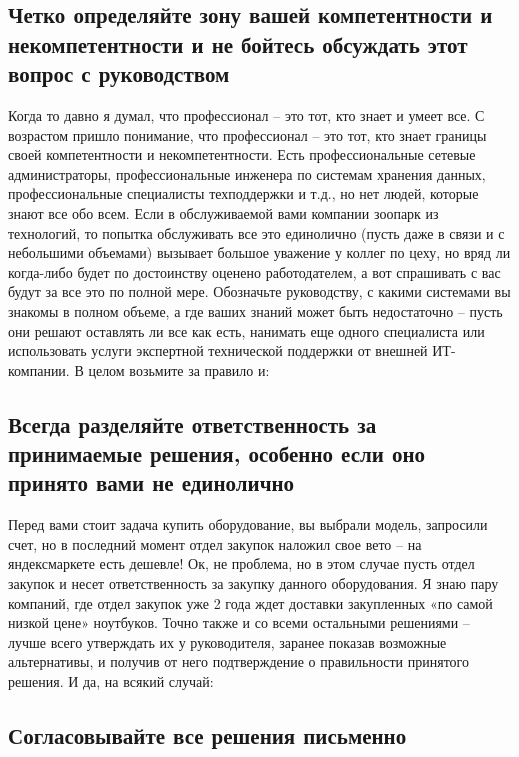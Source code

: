 	\subsection{Четко определяйте зону вашей компетентности и некомпетентности и не бойтесь обсуждать этот вопрос с руководством}
	
	Когда то давно я думал, что профессионал – это тот, кто знает и умеет все. С возрастом пришло понимание, что профессионал – это тот, кто знает границы своей компетентности и некомпетентности. Есть профессиональные сетевые администраторы, профессиональные инженера по системам хранения данных, профессиональные специалисты техподдержки и т.д., но нет людей, которые знают все обо всем. Если в обслуживаемой вами компании зоопарк из технологий, то попытка обслуживать все это единолично (пусть даже в связи и с небольшими объемами) вызывает большое уважение у коллег по цеху, но вряд ли когда-либо будет по достоинству оценено работодателем, а вот спрашивать с вас будут за все это по полной мере. Обозначьте руководству, с какими системами вы знакомы в полном объеме, а где ваших знаний может быть недостаточно – пусть они решают оставлять ли все как есть, нанимать еще одного специалиста или использовать услуги экспертной технической поддержки от внешней ИТ-компании. В целом возьмите за правило и:
	
	\subsection{Всегда разделяйте ответственность за принимаемые решения, особенно если оно принято вами не единолично}
	
	Перед вами стоит задача купить оборудование, вы выбрали модель, запросили счет, но в последний момент отдел закупок наложил свое вето – на яндексмаркете есть дешевле! Ок, не проблема, но в этом случае пусть отдел закупок и несет ответственность за закупку данного оборудования. Я знаю пару компаний, где отдел закупок уже 2 года ждет доставки закупленных «по самой низкой цене» ноутбуков. Точно также и со всеми остальными решениями – лучше всего утверждать их у руководителя, заранее показав возможные альтернативы, и получив от него подтверждение о правильности принятого решения. И да, на всякий случай:
	
	\subsection{Согласовывайте все решения письменно}
	
